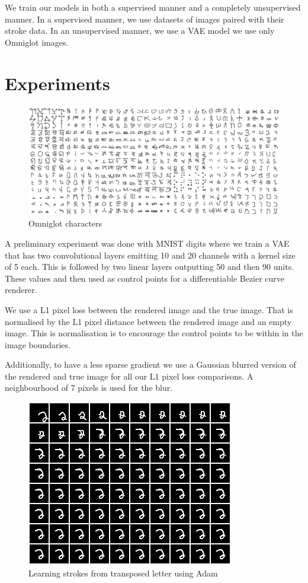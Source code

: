 \documentclass{article}
\begin{document}
We train our models in both a supervised manner and a completely
unsupervised manner. In a supervised manner, we use datasets of images
paired with their stroke data. In an unsupervised manner, we use a
VAE model we use only Omniglot images.


\section{Experiments}

\begin{figure}[htb!]
\includegraphics[scale=0.15]{omniglot_grid}
\caption{Omniglot characters}
\label{fig:omnigrid}
\end{figure}

A preliminary experiment was done with MNIST digits where we train a
VAE that has two convolutional layers emitting 10 and 20 channels with
a kernel size of 5 each. This is followed by two linear layers outputting
50 and then 90 units. These values and then used as control points for
a differentiable Bezier curve renderer.

We use a L1 pixel loss between the rendered image and the true
image. That is normalised by the L1 pixel distance between the
rendered image and an empty image. This is normalisation is to
encourage the control points to be within in the image boundaries.

Additionally, to have a less sparse gradient we use a Gaussian blurred
version of the rendered and true image for all our L1 pixel loss
comparisons. A neighbourhood of 7 pixels is used for the blur.

\begin{figure}[htb!]
\centering
\includegraphics[scale=0.75]{../results/recons_gauss5}
\caption{Learning strokes from transposed letter using Adam}
\label{fig:shiftedinit}
\end{figure}
\end{document}
